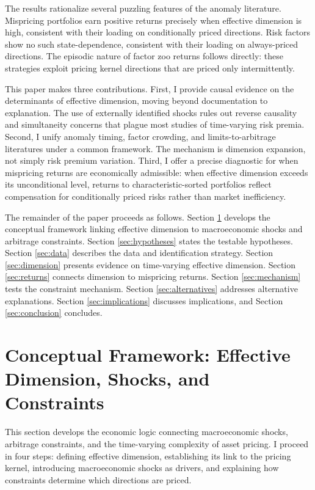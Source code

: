 \documentclass[12pt,letterpaper]{article}
\theoremstyle{plain}
\theoremstyle{definition}
\begin{document}
The results rationalize several puzzling features of the anomaly literature. Mispricing portfolios earn positive returns precisely when effective dimension is high, consistent with their loading on conditionally priced directions. Risk factors show no such state-dependence, consistent with their loading on always-priced directions. The episodic nature of factor zoo returns follows directly: these strategies exploit pricing kernel directions that are priced only intermittently.

This paper makes three contributions. First, I provide causal evidence on the determinants of effective dimension, moving beyond documentation to explanation. The use of externally identified shocks rules out reverse causality and simultaneity concerns that plague most studies of time-varying risk premia. Second, I unify anomaly timing, factor crowding, and limits-to-arbitrage literatures under a common framework. The mechanism is dimension expansion, not simply risk premium variation. Third, I offer a precise diagnostic for when mispricing returns are economically admissible: when effective dimension exceeds its unconditional level, returns to characteristic-sorted portfolios reflect compensation for conditionally priced risks rather than market inefficiency.

The remainder of the paper proceeds as follows. Section \ref{sec:framework} develops the conceptual framework linking effective dimension to macroeconomic shocks and arbitrage constraints. Section \ref{sec:hypotheses} states the testable hypotheses. Section \ref{sec:data} describes the data and identification strategy. Section \ref{sec:dimension} presents evidence on time-varying effective dimension. Section \ref{sec:returns} connects dimension to mispricing returns. Section \ref{sec:mechanism} tests the constraint mechanism. Section \ref{sec:alternatives} addresses alternative explanations. Section \ref{sec:implications} discusses implications, and Section \ref{sec:conclusion} concludes.


\section{Conceptual Framework: Effective Dimension, Shocks, and Constraints}\label{sec:framework}

This section develops the economic logic connecting macroeconomic shocks, arbitrage constraints, and the time-varying complexity of asset pricing. I proceed in four steps: defining effective dimension, establishing its link to the pricing kernel, introducing macroeconomic shocks as drivers, and explaining how constraints determine which directions are priced.
\end{document}
